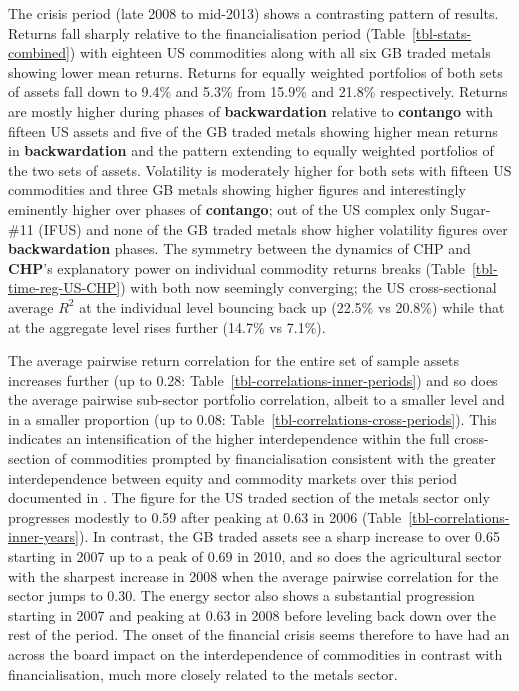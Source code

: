 \documentclass[
  authoryear,
  preprint,
  3p]{elsarticle}
\begin{document}
\bigskip
\bigskip

The crisis period (late 2008 to mid-2013) shows a contrasting pattern of
results. Returns fall sharply relative to the financialisation period
(Table~\ref{tbl-stats-combined}) with eighteen US commodities along with
all six GB traded metals showing lower mean returns. Returns for equally
weighted portfolios of both sets of assets fall down to 9.4\% and 5.3\%
from 15.9\% and 21.8\% respectively. Returns are mostly higher during
phases of \textbf{backwardation} relative to \textbf{contango} with
fifteen US assets and five of the GB traded metals showing higher mean
returns in \textbf{backwardation} and the pattern extending to equally
weighted portfolios of the two sets of assets. Volatility is moderately
higher for both sets with fifteen US commodities and three GB metals
showing higher figures and interestingly eminently higher over phases of
\textbf{contango}; out of the US complex only Sugar-\#11 (IFUS) and none
of the GB traded metals show higher volatility figures over
\textbf{backwardation} phases. The symmetry between the dynamics of CHP
and \textbf{CHP}'s explanatory power on individual commodity returns
breaks (Table~\ref{tbl-time-reg-US-CHP}) with both now seemingly
converging; the US cross-sectional average \(R^{2}\) at the individual
level bouncing back up (22.5\% vs 20.8\%) while that at the aggregate
level rises further (14.7\% vs 7.1\%).

\medskip

The average pairwise return correlation for the entire set of sample
assets increases further (up to 0.28:
Table~\ref{tbl-correlations-inner-periods}) and so does the average
pairwise sub-sector portfolio correlation, albeit to a smaller level and
in a smaller proportion (up to 0.08:
Table~\ref{tbl-correlations-cross-periods}). This indicates an
intensification of the higher interdependence within the full
cross-section of commodities prompted by financialisation consistent
with the greater interdependence between equity and commodity markets
over this period documented in
\citet{silvennoinen_financialisation_2013}. The figure for the US traded
section of the metals sector only progresses modestly to 0.59 after
peaking at 0.63 in 2006 (Table~\ref{tbl-correlations-inner-years}). In
contrast, the GB traded assets see a sharp increase to over 0.65
starting in 2007 up to a peak of 0.69 in 2010, and so does the
agricultural sector with the sharpest increase in 2008 when the average
pairwise correlation for the sector jumps to 0.30. The energy sector
also shows a substantial progression starting in 2007 and peaking at
0.63 in 2008 before leveling back down over the rest of the period. The
onset of the financial crisis seems therefore to have had an across the
board impact on the interdependence of commodities in contrast with
financialisation, much more closely related to the metals sector.
\end{document}
